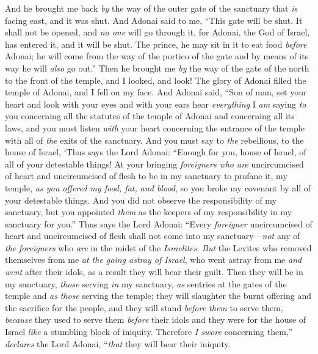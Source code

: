 \begin{biblechapter} %
 And he brought me back \textit{by} the way of the outer gate of the sanctuary that \textit{is} facing east, and it was shut.
\verse And Adonai said to me, “This gate will be shut. It shall not be opened, and \textit{no one} will go through it, for Adonai, the God of Israel, has entered it, and it will be shut.
\verse The prince, he may sit in it to eat food \textit{before} Adonai; he will come from the way of the portico of the gate and by means of its way he will \textit{also} go out.”
\verse Then he brought me \textit{by} the way of the gate of the north to the front of the temple, and I looked, and look! The glory of Adonai filled the temple of Adonai, and I fell on my face.
\verse And Adonai said, “Son of man, set your heart and look with your eyes and with your ears hear \textit{everything} I \textit{am} saying \textit{to} you concerning all the statutes of the temple of Adonai and concerning all its laws, and you must listen \textit{with} your heart concerning the entrance of the temple with all of \textit{the} exits of the sanctuary.
\verse And you must say to \textit{the} rebellious, to the house of Israel, ‘Thus says the Lord Adonai: “Enough for you, house of Israel, of all of your detestable things!
\verse At your bringing \textit{foreigners} \textit{who are} uncircumcised of heart and uncircumcised of flesh to be in my sanctuary to profane it, my temple, \textit{as you offered my food, fat, and blood}, so you broke my covenant by all of your detestable things.
\verse And you did not observe the responsibility of my sanctuary, but you appointed \textit{them} as the keepers of my responsibility in my sanctuary for you.”
\verse Thus says the Lord Adonai: “Every \textit{foreigner} uncircumcised of heart and uncircumcised of flesh shall not come into my sanctuary—\textit{not} any of \textit{the} \textit{foreigners} who \textit{are} in the midst of the \textit{Israelites}.
\verse \textit{But} the Levites who removed themselves from me \textit{at the going astray of Israel}, who went astray from me \textit{and went} after their idols, as a result they will bear their guilt.
\verse Then they will be in my sanctuary, \textit{those} serving \textit{in} my sanctuary, \textit{as} sentries at the gates of the temple and \textit{as} \textit{those} serving the temple; they will slaughter the burnt offering and the sacrifice for the people, and they will stand \textit{before them} to serve them,
\verse \textit{because} they used to serve them \textit{before} their idols and they were for the house of Israel \textit{like} a stumbling block of iniquity. Therefore \textit{I swore} concerning them,” \textit{declares} the Lord Adonai, “\textit{that} they will bear their iniquity.

\end{biblechapter}
